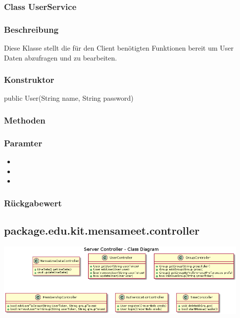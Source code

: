 \documentclass[a4paper]{scrreprt}
\begin{document}

\subsubsection{Class UserService}
\subsubsection*{Beschreibung}
Diese Klasse stellt die für den Client benötigten Funktionen bereit um User Daten abzufragen und zu bearbeiten. 

\subsubsection*{Konstruktor}
public User(String name, String password)

\subsubsection*{Methoden}
\begin{addmargin}[25pt]{0pt}

\subsubsection*{Paramter}
\begin{itemize}
\item
\item
\item
\end{itemize}

\subsubsection*{Rückgabewert}
\end{addmargin}






\subsection{package.edu.kit.mensameet.controller}
\begin{center}
	\includegraphics[width=0.93\textwidth]{Klassendiagramme/serverControllerCD.png}
\end{center}
\end{document}

